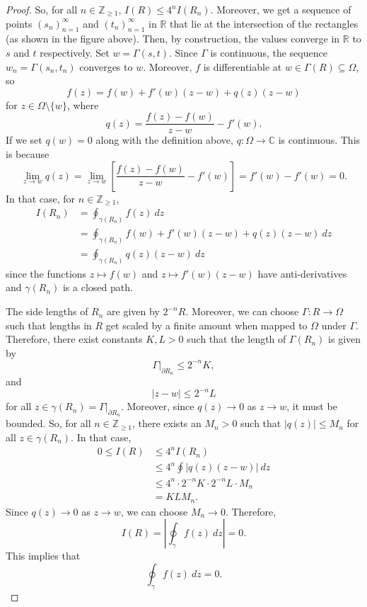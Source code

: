 \documentclass[a4paper, openany]{memoir}
\theoremstyle{definition}
\theoremstyle{plain}
\begin{document}
\begin{proof}
So, for all $n \in \mathbb{Z}_{\geq 1}$, $I(R) \leq 4^n I(R_n)$. Moreover, we get a sequence of points $(s_n)_{n=1}^{\infty}$ and $(t_n)_{n=1}^\infty$ in $\mathbb{R}$ that lie at the intersection of the rectangles (as shown in the figure above). Then, by construction, the values converge in $\mathbb{R}$ to $s$ and $t$ respectively. Set $w = \Gamma(s, t)$. Since $\Gamma$ is continuous, the sequence $w_n = \Gamma(s_n, t_n)$ converges to $w$. Moreover, $f$ is differentiable at $w \in \Gamma(R) \subseteq \Omega$, so
\[f(z) = f(w) + f'(w)(z - w) + q(z) (z - w)\]
for $z \in \Omega \setminus \{w\}$, where 
\[q(z) = \frac{f(z) - f(w)}{z - w} - f'(w).\]
If we set $q(w) = 0$ along with the definition above, $q: \Omega \to \mathbb{C}$ is continuous. This is because
\[\lim_{z \to w} q(z) = \lim_{z \to w} \left[\frac{f(z) - f(w)}{z - w} - f'(w)\right] = f'(w) - f'(w) = 0.\]
In that case, for $n \in \mathbb{Z}_{\geq 1}$,
\begin{align*}
    I(R_n) &= \oint_{\gamma(R_n)} f(z) \ dz \\
    &= \oint_{\gamma(R_n)} f(w) + f'(w) (z - w) + q(z) (z - w) \ dz \\
    &= \oint_{\gamma(R_n)} q(z) (z - w) \ dz
\end{align*}
since the functions $z \mapsto f(w)$ and $z \mapsto f'(w) (z - w)$ have anti-derivatives and $\gamma(R_n)$ is a closed path.

\noindent The side lengths of $R_n$ are given by $2^{-n} R$. Moreover, we can choose $\Gamma: R \to \Omega$ such that lengths in $R$ get scaled by a finite amount when mapped to $\Omega$ under $\Gamma$. Therefore, there exist constants $K, L > 0$ such that the length of $\Gamma(R_n)$ is given by
\[\Gamma|_{\partial R_n} \leq 2^{-n} K,\]
and
\[|z - w| \leq 2^{-n}L\]
for all $z \in \gamma(R_n) = \Gamma|_{\partial R_n}$.
Moreover, since $q(z) \to 0$ as $z \to w$, it must be bounded. So, for all $n \in \mathbb{Z}_{\geq 1}$, there exists an $M_n > 0$ such that $|q(z)| \leq M_n$ for all $z \in \gamma(R_n)$. In that case,
\begin{align*}
    0 \leq I(R) &\leq 4^n I(R_n) \\
    &\leq 4^n \oint |q(z) (z - w)| \ dz \\
    &\leq 4^n \cdot 2^{-n}K \cdot 2^{-n} L \cdot M_n \\
    &= KL M_n.
\end{align*}
Since $q(z) \to 0$ as $z \to w$, we can choose $M_n \to 0$. Therefore, 
\[I(R) = \left|\oint_\gamma f(z) \ dz\right| = 0.\]
This implies that
\[\oint_\gamma f(z) \ dz = 0.\]
\end{proof}
\end{document}
